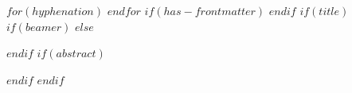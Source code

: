 $for(hyphenation)$
$endfor$
\newcommand\appendixmore{%
  \cleardoubleoddpage
}
$if(has-frontmatter)$
\frontmatter
$endif$
$if(title)$
$if(beamer)$
\frame{\titlepage}
$else$
\maketitle
$endif$
$if(abstract)$
\begin{abstract}
$abstract$
\end{abstract}
$endif$
$endif$

